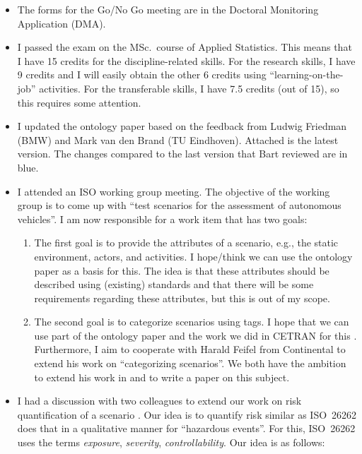 \documentclass[10pt,final,a4paper,oneside,onecolumn]{article}
\begin{document}
\begin{itemize}
	\item The forms for the Go/No Go meeting are in the Doctoral Monitoring Application (DMA).
	\item I passed the exam on the MSc.\ course of Applied Statistics. This means that I have 15 credits for the discipline-related skills. For the research skills, I have 9 credits and I will easily obtain the other 6 credits using ``learning-on-the-job'' activities. For the transferable skills, I have 7.5 credits (out of 15), so this requires some attention.
	\item I updated the ontology paper based on the feedback from Ludwig Friedman (BMW) and Mark van den Brand (TU Eindhoven). Attached is the latest version. The changes compared to the last version that Bart reviewed are in blue.
	\item I attended an ISO working group meeting. The objective of the working group is to come up with ``test scenarios for the assessment of autonomous vehicles''. I am now responsible for a work item that has two goals:
	\begin{enumerate}
		\item The first goal is to provide the attributes of a scenario, e.g., the static environment, actors, and activities. I hope/think we can use the ontology paper as a basis for this. The idea is that these attributes should be described using (existing) standards and that there will be some requirements regarding these attributes, but this is out of my scope.
		\item The second goal is to categorize scenarios using tags. 
		I hope that we can use part of the ontology paper and the work we did in CETRAN for this \cite{degelder2019scenarioclasses}. Furthermore, I aim to cooperate with Harald Feifel from Continental to extend his work on ``categorizing scenarios''. We both have the ambition to extend his work in \cite{lara2019harmonized} and to write a paper on this subject.
	\end{enumerate}
	\item I had a discussion with two colleagues to extend our work on risk quantification of a scenario \cite{degelder2019risk}. Our idea is to quantify risk similar as ISO~26262 \cite{ISO26262} does that in a qualitative manner for ``hazardous events''. For this, ISO~26262 uses the terms \emph{exposure}, \emph{severity}, \emph{controllability}. Our idea is as follows:

\end{itemize}
\end{document}

